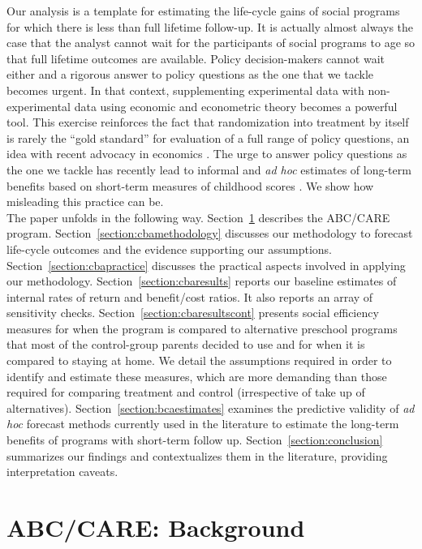 \noindent Our analysis is a template for estimating the life-cycle gains of social programs for which there is less than full lifetime follow-up. It is actually almost always the case that the analyst cannot wait for the participants of social programs to age so that full lifetime outcomes are available. Policy decision-makers cannot wait either and a rigorous answer to policy questions as the one that we tackle becomes urgent. In that context, supplementing experimental data with non-experimental data using economic and econometric theory becomes a powerful tool. This exercise reinforces the fact that randomization into treatment by itself is rarely the ``gold standard'' for evaluation of a full range of policy questions, an idea with recent advocacy in economics \citep{Athey_Imbens_2017_AE_JEP}. The urge to answer policy questions as the one we tackle has recently lead to informal and \textit{ad hoc} estimates of long-term benefits based on short-term measures of childhood scores \citep[e.g.][]{Kline_Walters_2016_QJE}. We show how misleading this practice can be.\\

\noindent The paper unfolds in the following way. Section~\ref{section:background} describes the ABC/CARE program. Section~\ref{section:cbamethodology} discusses our methodology to forecast life-cycle outcomes and the evidence supporting our assumptions. Section~\ref{section:cbapractice} discusses the practical aspects involved in applying our methodology. Section~\ref{section:cbaresults} reports our baseline estimates of internal rates of return and benefit/cost ratios. It also reports an array of sensitivity checks. Section~\ref{section:cbaresultscont} presents social efficiency measures for when the program is compared to alternative preschool programs that most of the control-group parents decided to use and for when it is compared to staying at home. We detail the assumptions required in order to identify and estimate these measures, which are more demanding than those required for comparing treatment and control (irrespective of take up of alternatives). Section~\ref{section:bcaestimates} examines the predictive validity of \emph{ad hoc} forecast methods currently used in the literature to estimate the long-term benefits of programs with short-term follow up. Section~\ref{section:conclusion} summarizes our findings and contextualizes them in the literature, providing interpretation caveats.

\section{ABC/CARE: Background} \label{section:background}

